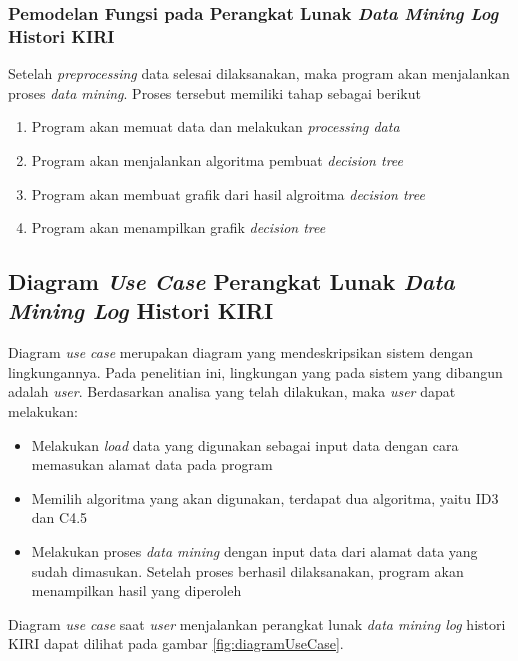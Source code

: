 \subsubsection{Pemodelan Fungsi pada Perangkat Lunak \textsl{Data Mining Log} Histori KIRI}
Setelah \textsl{preprocessing} data selesai dilaksanakan, maka program akan menjalankan proses \textsl{data mining}. Proses tersebut memiliki tahap sebagai berikut
\begin{enumerate}
	\item Program akan memuat data dan melakukan \textsl{processing data}
	\item Program akan menjalankan algoritma pembuat \textsl{decision tree} 
	\item Program akan membuat grafik dari hasil algroitma \textsl{decision tree}
	\item Program akan menampilkan grafik \textsl{decision tree}
\end{enumerate}  

\subsection{Diagram \textsl{Use Case} Perangkat Lunak \textsl{Data Mining Log} Histori KIRI}

Diagram \textsl{use case} merupakan diagram yang mendeskripsikan sistem dengan lingkungannya. Pada penelitian ini, lingkungan yang pada sistem yang dibangun adalah \textsl{user}. Berdasarkan analisa yang telah dilakukan, maka \textsl{user} dapat melakukan:
\begin{itemize}
	\item Melakukan \textsl{load} data yang digunakan sebagai input data dengan cara memasukan alamat data pada program
	\item Memilih algoritma yang akan digunakan, terdapat dua algoritma, yaitu ID3 dan C4.5
	\item Melakukan proses \textsl{data mining} dengan input data dari alamat data yang sudah dimasukan. Setelah proses berhasil dilaksanakan, program akan menampilkan hasil yang diperoleh
\end{itemize}

Diagram \textsl{use case} saat \textsl{user} menjalankan perangkat lunak \textsl{data mining log} histori KIRI dapat dilihat pada gambar \ref{fig:diagramUseCase}.

